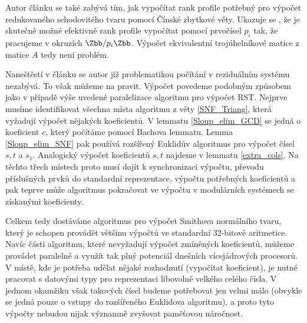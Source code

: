 Autor článku \cite{triang} se
také zabývá tím, jak vypočítat rank profile potřebný pro výpočet redukovaného
schodovitého tvaru pomocí Čínské zbytkové věty. Ukazuje se \cite[Theorem 15]{triang},
že je skutečně možné efektivně rank profile vypočítat pomocí prvočísel $ p_i $
tak, že pracujeme v okruzích $ \Zbb / p_i \Zbb $.
Výpočet ekvivalentní trojúhelníkové matice z matice $ A $ tedy není problém.

Naneštěstí v článku \cite{SNF_Arne} se autor již problematikou počítání v
reziduálním systému nezabývá. To však můžeme na
pravit. Výpočet povedeme podobným
způsobem jako v případě výše uvedené paralelizace algoritmu pro výpočet RST.
Nejprve musíme identifikovat všechna místa algoritmu z věty \ref{SNF_Triang},
která vyžadují výpočet nějakých koeficientů. V lemmatu \ref{Sloup_elim_GCD}
se jedná o koeficient $ c $, který počítáme pomocí Bachova lemmatu. Lemma
\ref{Sloup_elim_SNF} pak používá rozšířený Euklidův algoritmus pro výpočet čísel
$ s, t $ a $ s_1 $. Analogický výpočet koeficientů $ s, t $ najdeme v lemmatu
\ref{extra_cols}. Na těchto třech místech proto musí dojít k synchronizaci výpočtu,
převodu příslušných prvků do standardní reprezentace, výpočtu potřebných
koeficientů a pak teprve může algoritmus pokračovat ve výpočtu v modulárních
systémech se získanými koeficienty.

Celkem tedy dostáváme algoritmus pro výpočet Smithova normálního tvaru, který
je schopen provádět většinu výpočtů ve standardní 32-bitové aritmetice. Navíc části
algoritmu, které nevyžadují výpočet zmíněných koeficientů, můžeme provádet
paralelně a využít tak plný potenciál dnešních vícejádrových procesorů.
V místě, kde je potřeba udělat nějaké rozhodnutí (vypočítat koeficient),
je nutné pracovat s datovými typy pro reprezentaci libovolně velkého celého
čísla. V jednom okamžiku však takových čísel budeme potřebovat jen velmi málo
(obvykle se jedná pouze o vstupy do rozšířeného Euklidova algoritmu), a proto
tyto výpočty nebudou nijak významně zvyšovat paměťovou náročnost.
